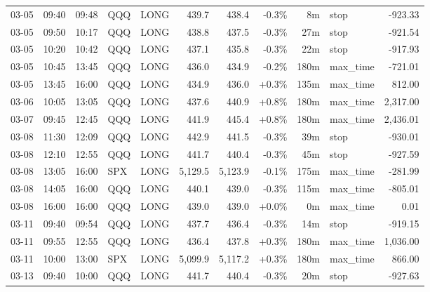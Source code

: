 \documentclass[11pt,a4paper,twoside]{article}
\begin{document}
\begin{center}
\begin{longtable}{>{\color{txtmain}}l l l l l r r r r >{\color{txtmain}}l r}
03-05 & 09:40 & 09:48 & QQQ & LONG & 439.7 & 438.4 & \textcolor{lossred}{-0.3\%} & 8m & stop & \textcolor{lossred}{-923.33} \\
03-05 & 09:50 & 10:17 & QQQ & LONG & 438.8 & 437.5 & \textcolor{lossred}{-0.3\%} & 27m & stop & \textcolor{lossred}{-921.54} \\
03-05 & 10:20 & 10:42 & QQQ & LONG & 437.1 & 435.8 & \textcolor{lossred}{-0.3\%} & 22m & stop & \textcolor{lossred}{-917.93} \\
03-05 & 10:45 & 13:45 & QQQ & LONG & 436.0 & 434.9 & \textcolor{lossred}{-0.2\%} & 180m & max\_time & \textcolor{lossred}{-721.01} \\
03-05 & 13:45 & 16:00 & QQQ & LONG & 434.9 & 436.0 & \textcolor{wingreen}{+0.3\%} & 135m & max\_time & \textcolor{wingreen}{812.00} \\
03-06 & 10:05 & 13:05 & QQQ & LONG & 437.6 & 440.9 & \textcolor{wingreen}{+0.8\%} & 180m & max\_time & \textcolor{wingreen}{2,317.00} \\
03-07 & 09:45 & 12:45 & QQQ & LONG & 441.9 & 445.4 & \textcolor{wingreen}{+0.8\%} & 180m & max\_time & \textcolor{wingreen}{2,436.01} \\
03-08 & 11:30 & 12:09 & QQQ & LONG & 442.9 & 441.5 & \textcolor{lossred}{-0.3\%} & 39m & stop & \textcolor{lossred}{-930.01} \\
03-08 & 12:10 & 12:55 & QQQ & LONG & 441.7 & 440.4 & \textcolor{lossred}{-0.3\%} & 45m & stop & \textcolor{lossred}{-927.59} \\
03-08 & 13:05 & 16:00 & SPX & LONG & 5,129.5 & 5,123.9 & \textcolor{lossred}{-0.1\%} & 175m & max\_time & \textcolor{lossred}{-281.99} \\
03-08 & 14:05 & 16:00 & QQQ & LONG & 440.1 & 439.0 & \textcolor{lossred}{-0.3\%} & 115m & max\_time & \textcolor{lossred}{-805.01} \\
03-08 & 16:00 & 16:00 & QQQ & LONG & 439.0 & 439.0 & \textcolor{wingreen}{+0.0\%} & 0m & max\_time & \textcolor{wingreen}{0.01} \\
03-11 & 09:40 & 09:54 & QQQ & LONG & 437.7 & 436.4 & \textcolor{lossred}{-0.3\%} & 14m & stop & \textcolor{lossred}{-919.15} \\
03-11 & 09:55 & 12:55 & QQQ & LONG & 436.4 & 437.8 & \textcolor{wingreen}{+0.3\%} & 180m & max\_time & \textcolor{wingreen}{1,036.00} \\
03-11 & 10:00 & 13:00 & SPX & LONG & 5,099.9 & 5,117.2 & \textcolor{wingreen}{+0.3\%} & 180m & max\_time & \textcolor{wingreen}{866.00} \\
03-13 & 09:40 & 10:00 & QQQ & LONG & 441.7 & 440.4 & \textcolor{lossred}{-0.3\%} & 20m & stop & \textcolor{lossred}{-927.63} \\

\end{longtable}
\end{center}
\end{document}
